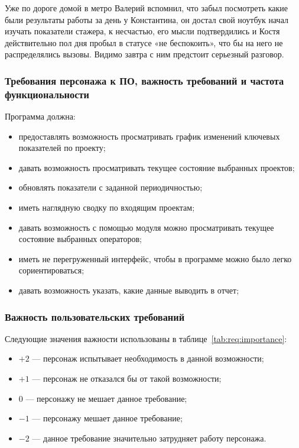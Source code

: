 Уже по дороге домой в метро Валерий вспомнил, что забыл посмотреть какие были результаты работы за день у Константина, он достал свой ноутбук начал изучать показатели стажера, к несчастью, его мысли подтвердились и Костя действительно пол дня пробыл в статусе «не беспокоить», что бы на него не распределялись вызовы. Видимо завтра с ним предстоит серьезный разговор.

\subsubsection{Требования персонажа к ПО, важность требований и частота функциональности}

Программа должна:
\begin{itemize}
    \item предоставлять возможность просматривать график изменений ключевых показателей по проекту;
    \item давать возможность просматривать текущее состояние выбранных проектов;
    \item обновлять показатели с заданной периодичностью;
    \item иметь наглядную сводку по входящим проектам;
    \item давать возможность с помощью модуля можно просматривать текущее состояние выбранных операторов;
    \item иметь не перегруженный интерфейс, чтобы в программе можно было легко сориентироваться;
    \item давать возможность указать, какие данные выводить в отчет;
\end{itemize}

\subsubsection{Важность пользовательских требований}

Следующие значения важности использованы в таблице~\ref{tab:req:importance}:
\begin{itemize}
    \item $+2$ --- персонаж испытывает необходимость в данной возможности;
    \item $+1$ --- персонаж не отказался бы от такой возможности;
    \item $0$ --- персонажу не мешает данное требование;
    \item $-1$ --- персонажу мешает данное требование;
    \item $-2$ --- данное требование значительно затрудняет работу персонажа.
\end{itemize}

